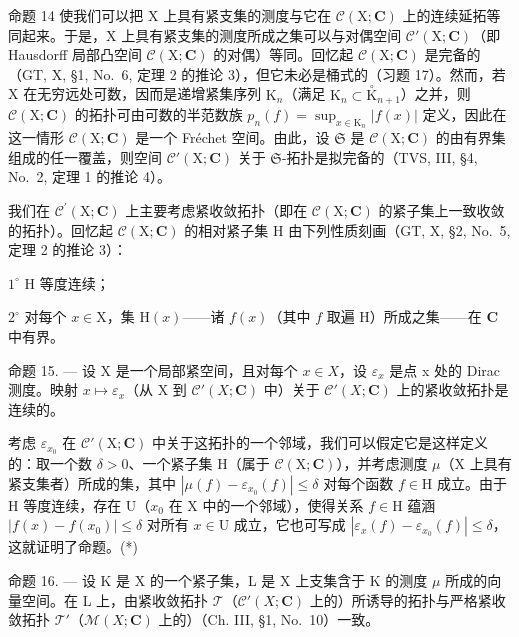 命题 14 使我们可以把 X 上具有紧支集的测度与它在 \(\mathcal{C}(\mathrm{X};\mathbf{C})\) 上的连续延拓等同起来。于是，X 上具有紧支集的测度所成之集可以与对偶空间 \(\mathcal{C}'(\mathrm{X};\mathbf{C})\)（即 Hausdorff 局部凸空间 \(\mathcal{C}(\mathrm{X};\mathbf{C})\) 的对偶）等同。回忆起 \(\mathcal{C}(\mathrm{X};\mathbf{C})\) 是完备的（GT, X, §1, No.~6, 定理 2 的推论 3），但它未必是桶式的（习题 17）。然而，若 X 在无穷远处可数，因而是递增紧集序列 \(\mathrm{K}_n\)（满足 \(\mathrm{K}_n \subset \overset{\circ}{\mathrm{K}}_{n+1}\)）之并，则 \(\mathcal{C}(\mathrm{X};\mathbf{C})\) 的拓扑可由可数的半范数族 \(p_n(f) = \sup_{x \in \mathrm{K}_n} |f(x)|\) 定义，因此在这一情形 \(\mathcal{C}(\mathrm{X};\mathbf{C})\) 是一个 Fréchet 空间。由此，设 \(\mathfrak{S}\) 是 \(\mathcal{C}(\mathrm{X};\mathbf{C})\) 的由有界集组成的任一覆盖，则空间 \(\mathcal{C}'(\mathrm{X};\mathbf{C})\) 关于 \(\mathfrak{S}\)-拓扑是拟完备的（TVS, III, §4, No.~2, 定理 1 的推论 4）。

我们在 \(\mathcal{C}^{\prime}(\mathrm{X};\mathbf{C})\) 上主要考虑紧收敛拓扑（即在 \(\mathcal{C}(\mathrm{X};\mathbf{C})\) 的紧子集上一致收敛的拓扑）。回忆起 \(\mathcal{C}(\mathrm{X};\mathbf{C})\) 的相对紧子集 H 由下列性质刻画（GT, X, §2, No.~5, 定理 2 的推论 3）：

\(1^{\circ}\) H 等度连续；

\(2^{\circ}\) 对每个 \(x \in \mathrm{X}\)，集 \(\mathrm{H}(x)\)——诸 \(f(x)\)（其中 \(f\) 取遍 \(\mathrm{H}\)）所成之集——在 \(\mathbf{C}\) 中有界。

命题 15. --- 设 X 是一个局部紧空间，且对每个 \(x \in X\)，设 \(\varepsilon_{x}\) 是点 x 处的 Dirac 测度。映射 \(x \mapsto \varepsilon_{x}\)（从 X 到 \(\mathcal{C}'(X; \mathbf{C})\) 中）关于 \(\mathcal{C}'(X; \mathbf{C})\) 上的紧收敛拓扑是连续的。

考虑 \(\varepsilon_{x_0}\) 在 \(\mathcal{C}'(\mathrm{X};\mathbf{C})\) 中关于这拓扑的一个邻域，我们可以假定它是这样定义的：取一个数 \(\delta > 0\)、一个紧子集 \(\mathrm{H}\)（属于 \(\mathcal{C}(\mathrm{X};\mathbf{C})\)），并考虑测度 \(\mu\)（\(\mathrm{X}\) 上具有紧支集者）所成的集，其中 \(|\mu(f) - \varepsilon_{x_0}(f)| \leqslant \delta\) 对每个函数 \(f \in \mathrm{H}\) 成立。由于 \(\mathrm{H}\) 等度连续，存在 \(\mathrm{U}\)（\(x_0\) 在 \(\mathrm{X}\) 中的一个邻域），使得关系 \(f \in \mathrm{H}\) 蕴涵 \(|f(x) - f(x_0)| \leqslant \delta\) 对所有 \(x \in \mathrm{U}\) 成立，它也可写成 \(|\varepsilon_x(f) - \varepsilon_{x_0}(f)| \leqslant \delta\)，这就证明了命题。(*)

命题 16. --- 设 K 是 X 的一个紧子集，L 是 X 上支集含于 K 的测度 \(\mu\) 所成的向量空间。在 L 上，由紧收敛拓扑 \(\mathcal{T}\)（\(\mathcal{C}'(X; \mathbf{C})\) 上的）所诱导的拓扑与严格紧收敛拓扑 \(\mathcal{T}'\)（\(\mathcal{M}(X; \mathbf{C})\) 上的）（Ch. III, §1, No.~10）一致。

